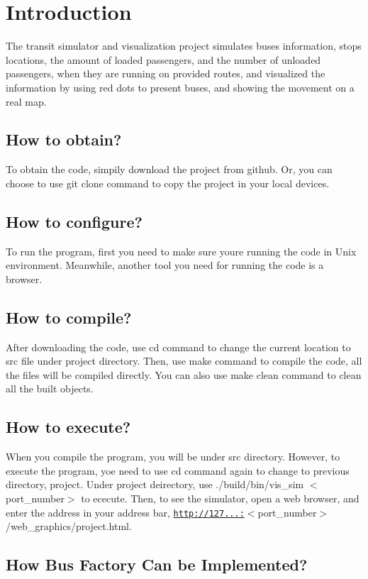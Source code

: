 \hypertarget{index_intro_sec}{}\section{Introduction}\label{index_intro_sec}
The transit simulator and visualization project simulates buses\textquotesingle{} information, stops\textquotesingle{} locations, the amount of loaded passengers, and the number of unloaded passengers, when they are running on provided routes, and visualized the information by using red dots to present buses, and showing the movement on a real map.\hypertarget{index_obtain_sec}{}\subsection{How to obtain?}\label{index_obtain_sec}
To obtain the code, simpily download the project from github. Or, you can choose to use git clone command to copy the project in your local devices.\hypertarget{index_config_sec}{}\subsection{How to configure?}\label{index_config_sec}
To run the program, first you need to make sure you\textquotesingle{}re running the code in Unix environment. Meanwhile, another tool you need for running the code is a browser.\hypertarget{index_compile_sec}{}\subsection{How to compile?}\label{index_compile_sec}
After downloading the code, use {\ttfamily cd} command to change the current location to src file under project directory. Then, use {\ttfamily make} command to compile the code, all the files will be compiled directly. You can also use {\ttfamily make clean} command to clean all the built objects.\hypertarget{index_execute_sec}{}\subsection{How to execute?}\label{index_execute_sec}
When you compile the program, you will be under src directory. However, to execute the program, yoe need to use {\ttfamily cd} command again to change to previous directory, project. Under project deirectory, use {\ttfamily ./build/bin/vis\+\_\+sim $<$port\+\_\+number$>$} to ececute. Then, to see the simulator, open a web browser, and enter the address in your address bar, {\ttfamily \href{http://127.0.0.1:}{\tt http\+://127...\+:}$<$port\+\_\+number$>$/web\+\_\+graphics/project.html}.\hypertarget{index_discussion_sec}{}\subsection{How Bus Factory Can be Implemented?}\label{index_discussion_sec}
